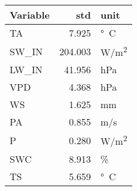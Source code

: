 \begin{table}
\centering
\caption{\CapStd}
\label{tbl:hai_std}
\begin{tabular}{lrl}
\toprule
Variable & std & unit \\
\midrule
TA & 7.925 & \si{°C} \\
SW\_IN & 204.003 & \si{W/m^2} \\
LW\_IN & 41.956 & \si{hPa} \\
VPD & 4.368 & \si{hPa} \\
WS & 1.625 & \si{mm} \\
PA & 0.855 & \si{m/s} \\
P & 0.280 & \si{W/m^2} \\
SWC & 8.913 & \si{\%} \\
TS & 5.659 & \si{°C} \\
\bottomrule
\end{tabular}
\end{table}
